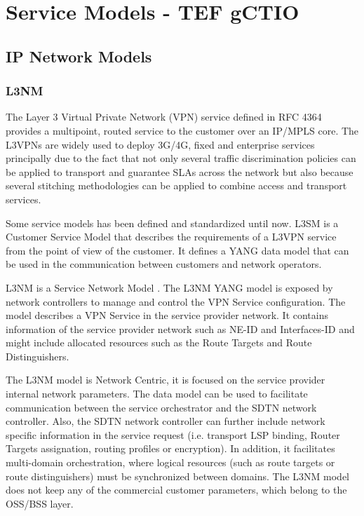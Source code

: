 \documentclass[a4paper,fleqn]{cas-dc}
\begin{document}
\section{Service Models - TEF gCTIO}
\label{section:models}

\subsection{IP Network Models}

\subsubsection{L3NM}

The Layer 3 Virtual Private Network (VPN) service defined in RFC 4364 \cite{rosen2006rfc} provides a multipoint, routed service to the customer over an IP/MPLS core. The L3VPNs are widely used to deploy 3G/4G, fixed and enterprise services principally due to the fact that not only several traffic discrimination policies can be applied to transport and guarantee SLAs across the network but also because several stitching methodologies can be applied to combine access and transport services. 

Some service models has been defined and standardized until now. L3SM \cite{rfc8299} is a Customer Service Model that describes the requirements of a L3VPN service from the point of view of the customer. It defines a YANG data model that can be used in the communication between customers and network operators. 

L3NM is a Service Network Model \cite{voyer2019internet}. The L3NM YANG model is exposed by network controllers to manage and control the VPN Service configuration. The model describes a VPN Service in the service provider network. It contains information of the service provider network such as NE-ID and Interfaces-ID and might include allocated resources such as the Route Targets and Route Distinguishers.

The L3NM model is Network Centric, it is focused on the service provider internal network parameters. The data model can be used to facilitate communication between the service orchestrator and the SDTN network controller. Also, the SDTN network controller can further include network specific information in the service request (i.e. transport LSP binding, Router Targets assignation, routing profiles or encryption). In addition, it facilitates multi-domain orchestration, where logical resources (such as route targets or route distinguishers) must be synchronized between domains.
The L3NM model does not keep any of the commercial customer parameters, which belong to the OSS/BSS layer.
\end{document}
